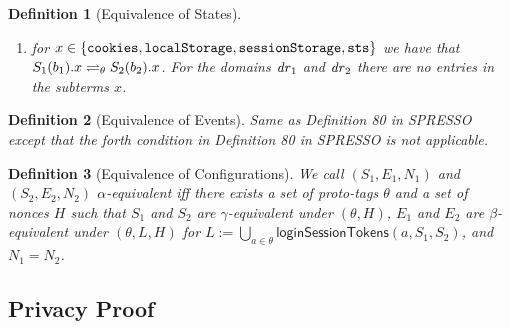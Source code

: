 \documentclass[letterpaper,onecolumn,10pt]{article}
\newtheorem{definition}{Definition}
\begin{document}
\begin{definition}[Equivalence of States]
\begin{enumerate}
\begin{enumerate}
\begin{enumerate}
\begin{enumerate}
          $S_1(b_1).j.\str{location} \prototagequiv{\theta}
          S_2(b_2).j.\str{location}$, and
        \item
          $S_1(b_1).j.\str{referrer} \prototagequiv{\theta}
          S_2(b_2).j.\str{referrer}$, and
        \item
          $S_1(b_1).j.\str{scriptstate} \prototagequiv{\theta}
          S_2(b_2).j.\str{scriptstate}$, and
        \item
          $S_1(b_1).j.\str{scriptinputs} \prototagequiv{\theta}
          S_2(b_2).j.\str{scriptinputs}$, and
        \item 
          $\forall t \in T$: $t$ is not contained in any subterm of 
          $S_1(b_1).j.\str{scriptstate}$ except for 
          $S_1(b_1).j.\str{scriptstate}.\mi{parameters}[\str{t}]$, and
        \item $\nexists\, l \in L$ such that $l$ is a subterm of
          $S_1(b_1).j.\str{scriptstate}$ or of
          $S_1(b_1).j.\str{scriptinputs}$, and
        \end{enumerate}
      \end{enumerate}
    \item\label{eqs:b:misc} for
      $x \in \{\mathtt{cookies},\mathtt{localStorage},\mathtt{sessionStorage},\mathtt{sts}\}$
      we have that $S_1(b_1).x \rightleftharpoons_{\theta} S_2(b_2).x$. For the
      domains $\mathit{dr}_1$ and $\mathit{dr}_2$ there are no entries in the
      subterms $x$.
    \end{enumerate}
  \end{enumerate}
\end{definition}

\begin{definition}[Equivalence of Events]
  \label{def:Events}
  Same as Definition 80 in SPRESSO except that the forth condition in Definition 80 in SPRESSO is not applicable.
\end{definition}

\begin{definition}[Equivalence of Configurations]
  We call $(S_1,E_1,N_1)$ and $(S_2,E_2,N_2)$
  \emph{$\alpha$-equivalent} iff there exists a set of proto-tags
  $\theta$ and a set of nonces $H$ such that $S_1$ and $S_2$ are
  $\gamma$-equivalent under $(\theta,H)$, $E_1$ and $E_2$ are
  $\beta$-equivalent under $(\theta,L,H)$ for
  $L := \bigcup_{a\in\theta} \mathsf{loginSessionTokens}(a,S_1,S_2)$,
  and $N_1 = N_2$.
\end{definition}

\subsection{Privacy Proof}
\end{document}

